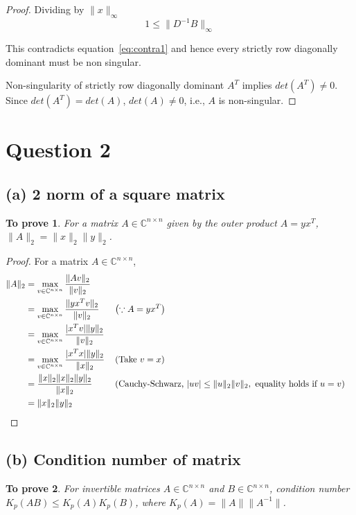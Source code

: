 \documentclass[11pt, oneside]{article}
\newtheorem*{remark}{To prove}
\begin{document}
\begin{proof}
		Dividing by $\|x\|_{\infty}$
		\begin{equation}
			1 \leq   \|D^{-1} B \|_{\infty} 
		\end{equation}
		
		This contradicts equation~\eqref{eq:contra1} and hence every strictly row diagonally dominant must be non singular.
		 
		Non-singularity of strictly row diagonally dominant $A^T$ implies $det(A^T) \neq 0$. Since $det(A^T) = det(A)$, $det(A) \neq 0$, i.e., $A$ is non-singular. 	
	\end{proof}

\section*{Question 2}
\subsection*{(a) 2 norm of a square matrix}
  	\begin{remark}
    		For a matrix $A \in \mathbb{C}^{n \times n}$ given by the outer product $A = y x^T$, $\|A\|_2 = \|x\|_2 \|y\|_2$.
  	\end{remark}
	
  	\begin{proof} For a matrix $A \in  \mathbb{C}^{n \times n}$,
    		\begin{align}
    			\|A\|_2 &= \max_{v \in \mathbb{C}^{n \times n}} \frac{\|Av\|_2}{\|v\|_2} \\
				&= \max_{v \in \mathbb{C}^{n \times n}} \frac{\|yx^Tv\|_2}{\|v\|_2} && \left(\because A = yx^T \right) \\
				&= \max_{v \in \mathbb{C}^{n \times n}} \frac{|x^Tv|\|y\|_2}{\|v\|_2} \\
				&= \max_{v \in \mathbb{C}^{n \times n}} \frac{|x^Tx|\|y\|_2}{\|x\|_2} && \left(\text{Take } v = x\right) \\
				&= \frac{\|x\|_2\|x\|_2 \|y\|_2}{\|x\|_2} && \left(\text{Cauchy-Schwarz, } |uv| \leq \|u\|_2\|v\|_2, \text{ equality holds if } u=v \right) \\
				&= \|x\|_2 \|y\|_2 && \qedhere
    		\end{align}
  	\end{proof}
  
\subsection*{(b) Condition number of matrix}
  	\begin{remark}
    		For invertible matrices $A \in \mathbb{C}^{n \times n}$ and $B \in \mathbb{C}^{n \times n}$, condition number $K_p(AB) \leq K_p(A) K_p(B)$, where $K_p(A) = \|A\| \|A^{-1}\|$. 
  	\end{remark}
	
\end{document}
